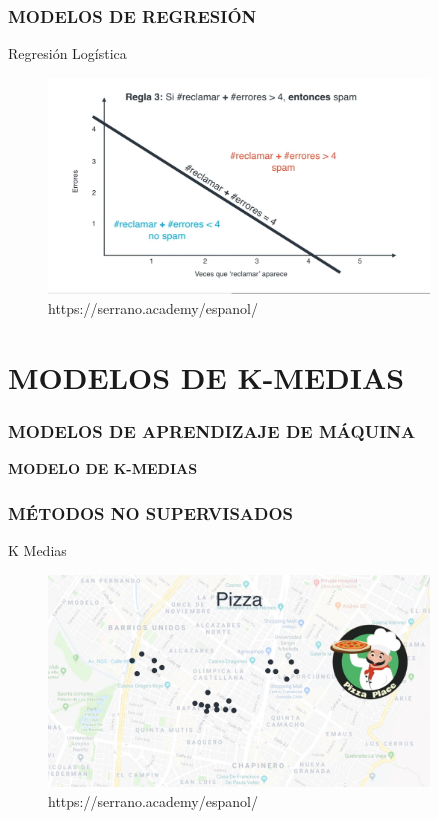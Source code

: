 \documentclass{beamer}
\begin{document}
\begin{frame}
	\frametitle{MODELOS DE REGRESIÓN}
	\begin{block}{Regresión Logística}	
		\begin{figure}
			\includegraphics[width=0.9\textwidth]{Imagenes_reg_log/IMG_3504.jpg}
			\caption{https://serrano.academy/espanol/}
		\end{figure}
	\end{block}
\end{frame}

\section{MODELOS DE K-MEDIAS}

\begin{frame}
	\frametitle{MODELOS DE APRENDIZAJE DE MÁQUINA}
	\begin{block}{}	
		\center
		\textbf{MODELO DE K-MEDIAS}
	\end{block}
\end{frame}


\begin{frame}
	\frametitle{MÉTODOS NO SUPERVISADOS}
	\begin{block}{K Medias}	
		\begin{figure}
			\includegraphics[width=0.9\textwidth]{Imagenes_k_means/IMG_3506.jpg}
			\caption{https://serrano.academy/espanol/}
		\end{figure}
	\end{block}
\end{frame}
\end{document}
